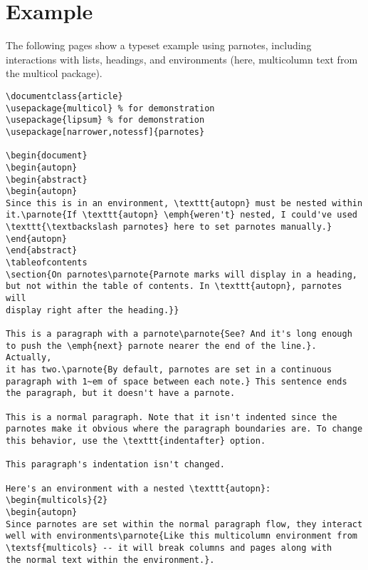 \documentclass[10pt]{article}
\begin{document}
\section{Example}
The following pages show a typeset example using \textsf{parnotes}, including interactions with lists,
headings, and environments (here, multicolumn text from the \textsf{multicol} package).
\begin{lstlisting}
\documentclass{article}
\usepackage{multicol} % for demonstration
\usepackage{lipsum} % for demonstration
\usepackage[narrower,notessf]{parnotes}

\begin{document}
\begin{autopn}
\begin{abstract}
\begin{autopn}
Since this is in an environment, \texttt{autopn} must be nested within
it.\parnote{If \texttt{autopn} \emph{weren't} nested, I could've used
\texttt{\textbackslash parnotes} here to set parnotes manually.}
\end{autopn}
\end{abstract}
\tableofcontents
\section{On parnotes\parnote{Parnote marks will display in a heading,
but not within the table of contents. In \texttt{autopn}, parnotes will
display right after the heading.}}

This is a paragraph with a parnote\parnote{See? And it's long enough
to push the \emph{next} parnote nearer the end of the line.}. Actually,
it has two.\parnote{By default, parnotes are set in a continuous
paragraph with 1~em of space between each note.} This sentence ends
the paragraph, but it doesn't have a parnote.

This is a normal paragraph. Note that it isn't indented since the
parnotes make it obvious where the paragraph boundaries are. To change
this behavior, use the \texttt{indentafter} option.

This paragraph's indentation isn't changed.

Here's an environment with a nested \texttt{autopn}:
\begin{multicols}{2}
\begin{autopn}
Since parnotes are set within the normal paragraph flow, they interact
well with environments\parnote{Like this multicolumn environment from
\textsf{multicols} -- it will break columns and pages along with
the normal text within the environment.}.


\end{lstlisting}
\end{document}
